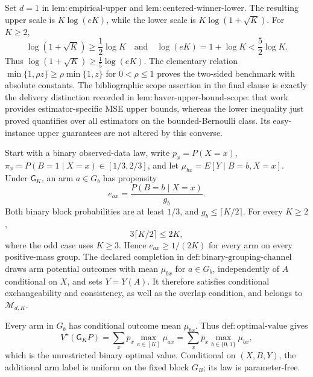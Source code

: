 Set \(d=1\) in \(\mathrm{lem{:}empirical\text{-}upper}\) and \(\mathrm{lem{:}centered\text{-}winner\text{-}lower}\).  The resulting upper scale is \(K\log(eK)\), while the lower scale is \(K\log(1+\sqrt K)\).  For \(K\geq2\),
\[
 \log(1+\sqrt K)\geq\frac12\log K
 \quad\text{and}\quad
 \log(eK)=1+\log K<\frac52\log K.
\]
Thus \(\log(1+\sqrt K)\geq\frac15\log(eK)\).  The elementary relation \(\min\{1,\rho z\}\geq\rho\min\{1,z\}\) for \(0<\rho\leq1\) proves the two-sided benchmark with absolute constants.  The bibliographic scope assertion in the final clause is exactly the delivery distinction recorded in \(\mathrm{lem{:}haver\text{-}upper\text{-}bound\text{-}scope}\): that work provides estimator-specific MSE upper bounds, whereas the lower inequality just proved quantifies over all estimators on the bounded-Bernoulli class.  Its easy-instance upper guarantees are not altered by this converse.

Start with a binary observed-data law, write \(p_x=P(X=x)\), \(\pi_x=P(B=1\mid X=x)\in[1/3,2/3]\), and let \(\mu_{bx}=E[Y\mid B=b,X=x]\).  Under \(\mathsf G_K\), an arm \(a\in G_b\) has propensity
\[
 e_{ax}=\frac{P(B=b\mid X=x)}{g_b}.
\]
Both binary block probabilities are at least \(1/3\), and \(g_b\leq\lceil K/2\rceil\).  For every \(K\geq2\),
\[
 3\lceil K/2\rceil\leq2K,
\]
where the odd case uses \(K\geq3\).  Hence \(e_{ax}\geq1/(2K)\) for every arm on every positive-mass group.  The declared completion in \(\mathrm{def{:}binary\text{-}grouping\text{-}channel}\) draws arm potential outcomes with mean \(\mu_{bx}\) for \(a\in G_b\), independently of \(A\) conditional on \(X\), and sets \(Y=Y(A)\).  It therefore satisfies conditional exchangeability and consistency, as well as the overlap condition, and belongs to \(\mathcal M_{d,K}\).

Every arm in \(G_b\) has conditional outcome mean \(\mu_{bx}\).  Thus \(\mathrm{def{:}optimal\text{-}value}\) gives
\[
 V^\star(\mathsf G_KP)
 =\sum_xp_x\max_{a\in[K]}\mu_{ax}
 =\sum_xp_x\max_{b\in\{0,1\}}\mu_{bx},
\]
which is the unrestricted binary optimal value.  Conditional on \((X,B,Y)\), the additional arm label is uniform on the fixed block \(G_B\); its law is parameter-free.

